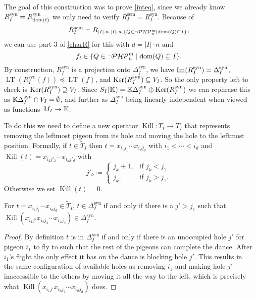 \documentclass{article}
\newcommand{\PHP}{\ensuremath{\neg \mathcal{PHP}^m_n}\xspace}
\newcommand{\LT}{\operatorname{LT}}
\newcommand{\Rsem}{R^\mathrm{sem}}
\newcommand{\Rsyn}{R^\mathrm{syn}}
\newcommand{\Dsyn}{\Delta^\mathrm{syn}}
\renewcommand{\K}{\operatorname{Kill}}
\begin{document}
The goal of this construction was to prove \eqref{inteq}, since we already know $\Rsyn_I = \Rsyn_{\dom(t)}$ we only need to verify $\Rsem_I = \Rsyn_I$. Because of $$\Rsem_I = R_{|I| \cdot n, |I| \cdot n, \{Q \in \PHP \mid \dom(Q) \subseteq I\}},$$ we can use part 3 of \autoref{charR} for this with $d = |I| \cdot n$ and
$$f_i \in \{Q \in \PHP \mid \dom(Q) \subseteq I\}.$$
By construction, $\Rsyn_I$ is a projection onto $\Dsyn_I$, we have $\Ima(\Rsyn_I) = \Dsyn_I$, $\LT(\Rsyn_I(f)) \preceq \LT(f)$, and $\Ker(\Rsyn_I) \subseteq V_I$. So the only property left to check is $\Ker(\Rsyn_I) \supseteq V_I$. Since $S_I(\KK) = \KK \Dsyn_I \oplus \Ker(\Rsyn_I)$ we can rephrase this as $\KK \Dsyn_I \cap V_I = \emptyset$, and further as $\Dsyn_I$ being linearly independent when viewed as functions $M_I \to \mathbb{K}$.

To do this we need to define a new operator $\K: T_I \to \tilde T_I$ that represents removing the leftmost pigeon from its hole and moving the hole to the leftmost position. Formally, if $t \in \tilde T_I$ then $t = x_{i_1 j_1} \cdots x_{i_d j_d}$ with $i_1 < \cdots < i_d$ and $\K(t) = x_{i_2 j'_2} \cdots x_{i_d j'_d}$ with
$$
j'_k \coloneqq \begin{cases}
    j_k + 1, &\text{if } j_k < j_1\\
    j_k, &\text{if } j_k > j_1.
\end{cases}
$$
Otherwise we set $\K(t) = 0$.

\begin{theorem} \label{killdefn}
    For $t = x_{i_1 j_1} \cdots x_{i_d j_d} \in \tilde T_I$, $t \in \Dsyn_I$ if and only if there is a $j' > j_1$ such that $\K(x_{i_1 j'} x_{i_2 j_2} \cdots x_{i_d j_d}) \in \Dsyn_I$.
\end{theorem}
\begin{proof}
    By definition $t$ is in $\Dsyn_I$ if and only if there is an unoccupied hole $j'$ for pigeon $i_1$ to fly to such that the rest of the pigeons can complete the dance. After $i_1$'s flight the only effect it has on the dance is blocking hole $j'$. This results in the same configuration of available holes as removing $i_1$ and making hole $j'$ inaccessible to the others by moving it all the way to the left, which is precisely what $\K(x_{i_1 j'} x_{i_2 j_2} \cdots x_{i_d j_d})$ does.
\end{proof}
\end{document}
